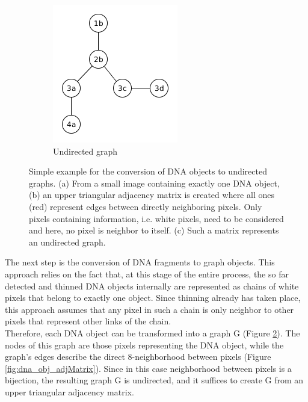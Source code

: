 \documentclass{article}
\begin{document}
\begin{figure}[!htbp]
\begin{subfigure}{0.25\textwidth}
		\includegraphics[width=\linewidth]{small_DNA_obj_graph.png}
		\caption{Undirected graph}
		\label{fig:dna_obj_graph}
	\end{subfigure}
	\caption{Simple example for the conversion of DNA objects to undirected graphs.
		(a) From a small image containing exactly one DNA object, (b) an upper triangular adjacency matrix is created where all ones (red) represent edges between directly neighboring pixels. Only pixels containing information, i.e. white pixels, need to be considered and here, no pixel is neighbor to itself. (c) Such a matrix represents an undirected graph.}
	\label{fig:dna_graph_creation}
\end{figure}
The next step is the conversion of DNA fragments to graph objects. This approach relies on the fact that, at this stage of the entire process, the so far detected and thinned DNA objects internally are represented as chains of white pixels that belong to exactly one object. Since thinning already has taken place, this approach assumes that any pixel in such a chain is only neighbor to other pixels that represent other links of the chain.\\
Therefore, each DNA object can be transformed into a graph G (Figure \ref{fig:dna_graph_creation}). The nodes of this graph are those pixels representing the DNA object, while the graph's edges describe the direct 8-neighborhood between pixels (Figure \ref{fig:dna_obj_adjMatrix}). Since in this case neighborhood between pixels is a bijection, the resulting graph G is undirected, and it suffices to create G from an upper triangular adjacency matrix.\\
\end{document}
